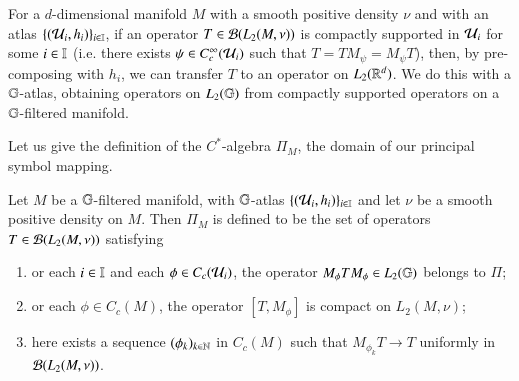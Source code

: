 \documentclass[leqno]{amsart}
\begin{document}
	For a $d$-dimensional manifold $M$ with a smooth positive density $\nu$ and with an atlas $\{({\mathcal U}_{i},h_{i})\}_{i\in\mathbb I}$, if an operator $T\in{\mathcal B}(L_{2}(M,\nu))$ is compactly supported in ${\mathcal U}_{i}$ for some $i\in\mathbb I$ (i.e. there exists $\psi\in C_{c}^{\infty}({\mathcal U}_{i})$ such that $T=TM_{\psi}=M_{\psi}T$), then, by pre-composing with $h_{i}$, we can transfer $T$ to an operator on $L_{2}(\mathbb{R}^{d})$. We do this with a $\mathbb{G}$-atlas, obtaining operators on $L_2(\mathbb{G})$ from compactly supported operators on a $\mathbb{G}$-filtered manifold.
	
	Let us give the definition of the $C^{*}$-algebra $\Pi_{M}$, the domain of our principal symbol mapping.
	\begin{definition}\label{Pi-X}
		Let $M$ be a $\mathbb{G}$-filtered manifold, with $\mathbb{G}$-atlas $\{({\mathcal U}_{i},h_{i})\}_{i\in\mathbb I}$ and let $\nu$ be a smooth positive density on $M$. Then $\Pi_{M}$ is defined to be the set of operators $T\in{\mathcal B}(L_{2}(M,\nu))$ satisfying
		\begin{enumerate}[\rm(1)]
			\item\label{Pi tranfer to group} or each $i\in\mathbb I$ and each $\phi\in C_{c}({\mathcal U}_{i})$, the operator $M_{\phi}TM_{\phi}\in L_{2}(\mathbb{G})$ belongs to $\Pi$;
			\item {}or each $\phi\in C_{c}(M)$, the operator $[T,M_{\phi}]$ is compact on $L_{2}(M,\nu)$;
			\item {}here exists a sequence $(\phi_k)_{k\in\mathbb{N}}$ in $C_{c}(M)$ such that $M_{\phi_k}T\to T$ uniformly in ${\mathcal B}(L_{2}(M,\nu))$.
		\end{enumerate}
	\end{definition}
	
	
	
	
	
	
	
	
	
\end{document}
